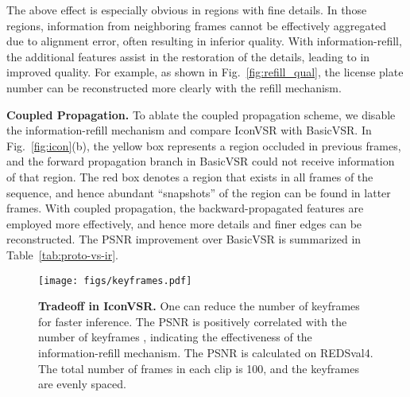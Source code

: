 \documentclass[final]{cvpr}
\begin{document}
The above effect is especially obvious in regions with fine details. In those regions, information from neighboring frames cannot be effectively aggregated due to alignment error, often resulting in inferior quality. With information-refill, the additional features assist in the restoration of the details, leading to in improved quality.
For example, as shown in Fig.~\ref{fig:refill_qual}, the license plate number can be reconstructed more clearly with the refill mechanism.\\
\vspace{-0.3cm}

\noindent\textbf{Coupled Propagation.}
To ablate the coupled propagation scheme, we disable the information-refill mechanism and compare \mbox{IconVSR} with \mbox{BasicVSR}. In Fig.~\ref{fig:icon}(b), the yellow box represents a region occluded in previous frames, and the forward propagation branch in \mbox{BasicVSR} could not receive information of that region. The red box denotes a region that exists in all frames of the sequence, and hence abundant ``snapshots'' of the region can be found in latter frames.
With coupled propagation, the backward-propagated features are employed more effectively, and hence more details and finer edges can be reconstructed. The PSNR improvement over \mbox{BasicVSR} is summarized in Table~\ref{tab:proto-vs-ir}.

\begin{table}[!t]
	\caption{\textbf{Evaluations of \mbox{IconVSR} components.} The two components bring an improvement of up to 0.28~dB over \mbox{BasicVSR}. The PSNR is computed on REDS4/REDSval4.}
	\label{tab:proto-vs-ir}
	\begin{center}
	\end{center}
	\vspace{-0.5cm}
\end{table}
\begin{figure}[!t]
	\begin{center}
		\texttt{[image: figs/keyframes.pdf]}
		\caption{\textbf{Tradeoff in \mbox{IconVSR}.} One can reduce the number of keyframes for faster inference. The PSNR is positively correlated with the number of keyframes , indicating the effectiveness of the information-refill mechanism. The PSNR is calculated on REDSval4. The total number of frames in each clip is 100, and the keyframes are evenly spaced.}
		\vspace{-0.7cm}
		\label{fig:keyframes}
	\end{center}
\end{figure}
\end{document}
